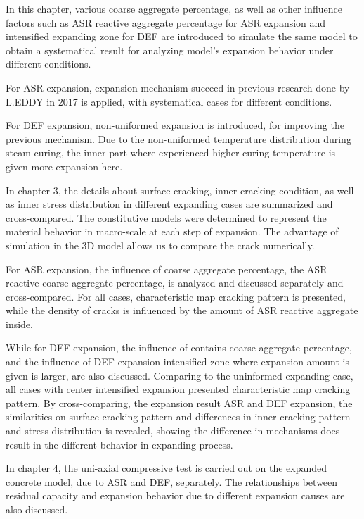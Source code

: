 In this chapter, various coarse aggregate percentage, as well as other influence factors such as ASR reactive aggregate percentage for ASR expansion and intensified expanding zone for DEF are introduced to simulate the same model to obtain a systematical result for analyzing model's expansion behavior under different conditions.

For ASR expansion, expansion mechanism succeed in previous research done by L.EDDY in 2017 is applied, with systematical cases for different conditions.

For DEF expansion, non-uniformed expansion is introduced, for improving the previous mechanism. Due to the non-uniformed temperature distribution during steam curing, the inner part where experienced higher curing temperature is given more expansion here.

%

In chapter 3, the details about surface cracking, inner cracking condition, as well as inner stress distribution in different expanding cases are summarized and cross-compared. The constitutive models were determined to represent the material behavior in macro-scale at each step of expansion. The advantage of simulation in the 3D model allows us to compare the crack numerically.

For ASR expansion, the influence of coarse aggregate percentage, the ASR reactive coarse aggregate percentage, is analyzed and discussed separately and cross-compared. For all cases, characteristic map cracking pattern is presented, while the density of cracks is influenced by the amount of ASR reactive aggregate inside.

While for DEF expansion, the influence of contains coarse aggregate percentage, and the influence of DEF expansion intensified zone where expansion amount is given is larger, are also discussed. Comparing to the uninformed expanding case, all cases with center intensified expansion presented characteristic map cracking pattern. By cross-comparing, the expansion result ASR and DEF expansion, the similarities on surface cracking pattern and differences in inner cracking pattern and stress distribution is revealed, showing the difference in mechanisms does result in the different behavior in expanding process.

%

In chapter 4, the uni-axial compressive test is carried out on the expanded concrete model, due to ASR and DEF, separately. The relationships between residual capacity and expansion behavior due to different expansion causes are also discussed.

